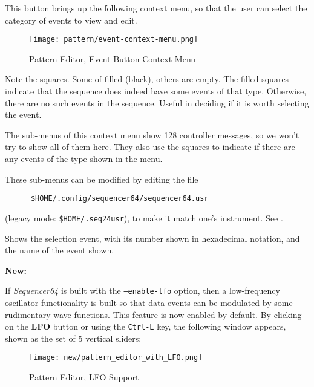    \setcounter{ItemCounter}{0}      %

   This button brings up the following context menu, so that the user can
   select the category of events to view and edit.

\begin{figure}[H]
   \centering 
   \texttt{[image: pattern/event-context-menu.png]}
   \caption{Pattern Editor, Event Button Context Menu}
   \label{fig:pattern_editor_bottom_event_context_menu}
\end{figure}

   Note the squares.  Some of filled (black), others are empty.  The filled
   squares indicate that the sequence does indeed have some events of that
   type.  Otherwise, there are no such events in the sequence.
   Useful in deciding if it is worth selecting the event.

   The sub-menus of this context menu show 128 controller messages,
   so we won't try to show all of them here.  They also use the squares to
   indicate if there are any events of the type shown in the menu.

   These sub-menus can be modified by editing the file
   
   \begin{verbatim}
      $HOME/.config/sequencer64/sequencer64.usr
   \end{verbatim}

   (legacy mode: \texttt{\$HOME/.seq24usr}), to make it match one's
   instrument.  See .

   Shows the selection event, with its number shown in hexadecimal notation,
   and the name of the event shown.

   \textbf{New:}

   If \textsl{Sequencer64} is built with the \texttt{--enable-lfo} option,
   then a low-frequency oscillator functionality is built so that data events
   can be modulated by some rudimentary wave functions.
   This feature is now enabled by default.
   By clicking on the \textbf{LFO} button or using the \texttt{Ctrl-L} key,
   the following window appears, shown as the set of 5 vertical sliders:

\begin{figure}[H]
   \centering 
   \texttt{[image: new/pattern\_editor\_with\_LFO.png]}
   \caption{Pattern Editor, LFO Support}
   \label{fig:pattern_editor_bottom_lfo_support}
\end{figure}

